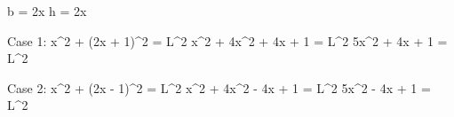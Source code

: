 b = 2x
h = 2x 

Case 1:
x^2 + (2x + 1)^2 = L^2
x^2 + 4x^2 + 4x + 1 = L^2
5x^2 + 4x + 1 = L^2

Case 2:
x^2 + (2x - 1)^2 = L^2
x^2 + 4x^2 - 4x + 1 = L^2
5x^2 - 4x + 1 = L^2